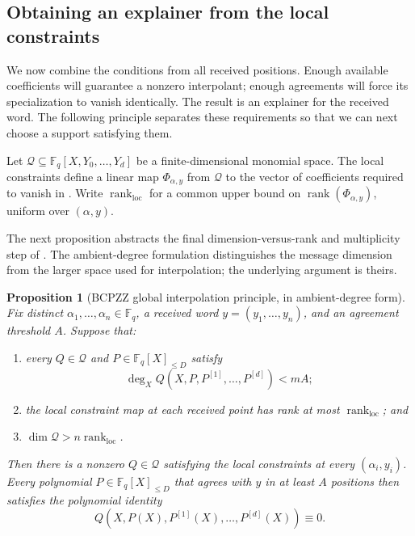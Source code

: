 \documentclass[11pt,letterpaper]{article}
\newtheorem{proposition}[proposition]{Proposition}
\theoremstyle{definition}
\newcommand{\F}{\mathbb{F}}
\newcommand{\rank}{\operatorname{rank}}
\newcommand{\Qspace}{\mathcal{Q}}
\begin{document}
\subsection{Obtaining an explainer from the local constraints}
We now combine the conditions from all received positions. Enough
available coefficients will guarantee a nonzero interpolant; enough
agreements will force its specialization to vanish identically. The
result is an explainer for the received word. The following principle
separates these requirements so that we can next choose a support
satisfying them.


Let \(\Qspace\subseteq\F_q[X,Y_0,\ldots,Y_d]\) be a finite-dimensional
monomial space.  The local constraints define a linear map
\(\Phi_{\alpha,y}\) from \(\Qspace\) to the vector of coefficients required to
vanish in .  Write
\(\rank_{\mathrm{loc}}\) for a common upper bound on
\(\rank(\Phi_{\alpha,y})\), uniform over \((\alpha,y)\).

The next proposition abstracts the final dimension-versus-rank and multiplicity step of
\cite[Proposition~3.13]{BCPZZ26}. The ambient-degree formulation distinguishes the message dimension from the
larger space used for interpolation; the underlying argument is theirs.

\begin{proposition}[BCPZZ global interpolation principle, in ambient-degree form]
\label{prop:global-interpolation-principle}
Fix distinct \(\alpha_1,\ldots,\alpha_n\in\F_q\), a received word
\(y=(y_1,\ldots,y_n)\), and an agreement threshold \(A\).  Suppose that:
\begin{enumerate}[label=\textup{(\roman*)}]
  \item every \(Q\in\Qspace\) and \(P\in\F_q[X]_{\leq D}\) satisfy
  \begin{equation}
    \deg_X Q(X,P,P^{[1]},\ldots,P^{[d]})<mA;
    \label{eq:global-specialization-degree-hypothesis}
  \end{equation}
  \item the local constraint map at each received point has rank at most
  \(\rank_{\mathrm{loc}}\); and
  \item \(\dim\Qspace>n\rank_{\mathrm{loc}}\).
\end{enumerate}
Then there is a nonzero \(Q\in\Qspace\) satisfying the local constraints at
every \((\alpha_i,y_i)\).  Every polynomial
\(P\in\F_q[X]_{\leq D}\) that agrees with \(y\) in at least \(A\) positions
then satisfies the polynomial identity
\begin{equation}
  Q(X,P(X),P^{[1]}(X),\ldots,P^{[d]}(X))\equiv 0.
  \label{eq:global-differential-identity}
\end{equation}
\end{proposition}
\end{document}
